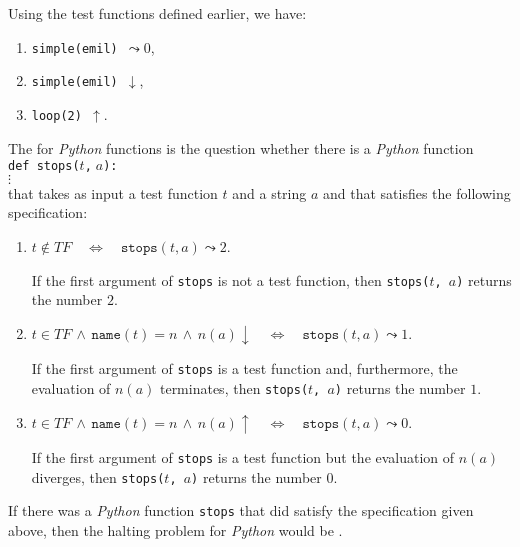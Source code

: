 \examplesEng  Using the test functions defined earlier, we have:
\begin{enumerate}
\item {\tt simple(emil) $\leadsto 0$},
\item {\tt simple(emil) $\downarrow$},
\item {\tt loop(2) $\uparrow$}.
\end{enumerate}

\noindent
The   for \textsl{Python} functions is the question whether there is a
\textsl{Python} function \\[0.2cm]
\hspace*{1.3cm} \texttt{def stops($t$,$\;a$): } \\
\hspace*{2.3cm} $\vdots$
\\[0.2cm] 
that takes as input a test function $t$ and a string $a$ and that satisfies the following specification:
\begin{enumerate}
\item $t \not\in T\!F \quad\Leftrightarrow\quad \mathtt{stops}(t, a) \leadsto 2$.

      If the first argument of \texttt{stops} is not a test function, then 
      \texttt{stops($t$, $a$)} returns the number $2$.

\item $t \in T\!F \,\wedge\, \mathtt{name}(t) = n \,\wedge\, n(a)\downarrow \quad\Leftrightarrow\quad
       \mathtt{stops}(t, a) \leadsto 1$.

      If the first argument of \texttt{stops} is a test function and, furthermore,
      the evaluation of $n(a)$ terminates, then \texttt{stops($t$, $a$)} returns the number $1$.

\item $t \in T\!F \,\wedge\, \mathtt{name}(t) = n \,\wedge\, n(a)\uparrow \quad\Leftrightarrow\quad
       \mathtt{stops}(t, a) \leadsto 0$.

      If the first argument of \texttt{stops} is a test function but the evaluation of $n(a)$ 
      diverges, then \linebreak
      \texttt{stops($t$, $a$)} returns the number $0$.
\end{enumerate}
If there was a \textsl{Python} function \texttt{stops} that did satisfy the specification given above,
then the halting problem for \textsl{Python} would be .

